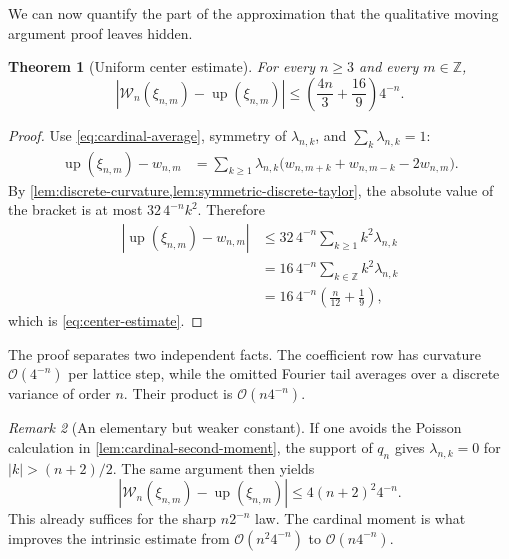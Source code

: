 \documentclass[11pt,oneside]{article}
\newtheorem{theorem}{Theorem}[section]
\theoremstyle{definition}
\theoremstyle{remark}
\newtheorem{remark}[theorem]{Remark}
\newcommand{\Z}{\mathbb Z}
\newcommand{\Up}{\operatorname{up}}
\newcommand{\bigO}{\mathcal O}
\newcommand{\abs}[1]{\left\lvert #1\right\rvert}
\begin{document}
We can now quantify the part of the approximation that the qualitative moving
argument proof leaves hidden.

\begin{theorem}[Uniform center estimate]
\label{thm:center-estimate}
For every $n\ge3$ and every $m\in\Z$,
\begin{equation}
 \boxed{\displaystyle
 \abs{\mathcal W_n(\xi_{n,m})-\Up(\xi_{n,m})}
 \le
 \left(\frac{4n}{3}+\frac{16}{9}\right)4^{-n}.}            \label{eq:center-estimate}
\end{equation}
\end{theorem}

\begin{proof}
Use \eqref{eq:cardinal-average}, symmetry of $\lambda_{n,k}$, and
$\sum_k\lambda_{n,k}=1$:
\begin{align*}
 \Up(\xi_{n,m})-w_{n,m}
 &=\sum_{k\ge1}\lambda_{n,k}
   \bigl(w_{n,m+k}+w_{n,m-k}-2w_{n,m}\bigr).
\end{align*}
By \cref{lem:discrete-curvature,lem:symmetric-discrete-taylor}, the absolute
value of the bracket is at most $32\,4^{-n}k^2$.  Therefore
\begin{align*}
 \abs{\Up(\xi_{n,m})-w_{n,m}}
 &\le32\,4^{-n}\sum_{k\ge1}k^2\lambda_{n,k}\\
 &=16\,4^{-n}\sum_{k\in\Z}k^2\lambda_{n,k}\\
 &=16\,4^{-n}\left(\frac{n}{12}+\frac19\right),
\end{align*}
which is \eqref{eq:center-estimate}.
\end{proof}

The proof separates two independent facts.  The coefficient row has curvature
$\bigO(4^{-n})$ per lattice step, while the omitted Fourier tail averages over a
discrete variance of order $n$.  Their product is $\bigO(n4^{-n})$.

\begin{remark}[An elementary but weaker constant]
If one avoids the Poisson calculation in \cref{lem:cardinal-second-moment}, the
support of $q_n$ gives $\lambda_{n,k}=0$ for
$\abs{k}>(n+2)/2$.  The same argument then yields
\begin{equation*}
 \abs{\mathcal W_n(\xi_{n,m})-\Up(\xi_{n,m})}
 \le4(n+2)^2 4^{-n}.
\end{equation*}
This already suffices for the sharp $n2^{-n}$ law.  The cardinal moment is what
improves the intrinsic estimate from $\bigO(n^2 4^{-n})$ to
$\bigO(n4^{-n})$.
\end{remark}
\end{document}
